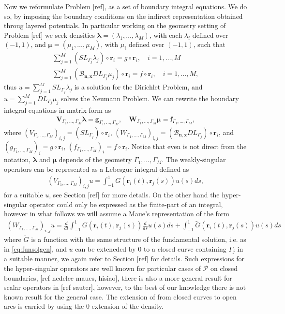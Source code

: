 \documentclass{article}
\newcommand{\todo}[1]{{\color{red}[#1]}}
\newcommand{\bmu} {\bm{\mu}}
\newcommand{\bg}{\bm{g}}
\newcommand{\bla}{\boldsymbol \lambda}
\newcommand{\bn}{\bm{n}}
\newcommand{\br}{\bm{r}}
\newcommand{\bx}{\bm{x}}
\begin{document}
Now we reformulate Problem \todo{ref}, as a set of boundary integral equations. We do so, by imposing the boundary conditions on the indirect representation obtained throug layered potentials. In particular working on the geometry setting of Problem \todo{ref} we seek densities $\bla = (\lambda_1,\hdots,\lambda_M)$, with each $\lambda_i$ defined over $(-1,1)$, and $\bmu = (\mu_1, \hdots, \mu_M)$, with $\mu_i$ defined over $(-1,1)$, such that
\begin{align*}
\sum_{j=1}^M (SL_{\Gamma_j} \lambda_j )\circ \br_i = g\circ \br_i, \quad i = 1,\hdots,M \\
\sum_{j=1}^M (\mathcal{B}_{\bn,\bx}DL_{\Gamma_j} \mu_j )\circ \br_i = f\circ \br_i, \quad i = 1,\hdots,M,
\end{align*}
 thus $u = \sum_{j=1}^M SL_{\Gamma_j} \lambda_j $ is a solution for the Dirichlet Problem, and  $u = \sum_{j=1}^M DL_{\Gamma_j} \mu_j $ solves the Neumann Problem. We can rewrite the boundary integral equations in matrix form as 
\begin{align}
\label{eq:bios}
\mathbf{V}_{\Gamma_1,\hdots,\Gamma_M} \bla = \bg_{\Gamma_1,\hdots,\Gamma_M}, \quad \mathbf{W}_{\Gamma_1,\hdots,\Gamma_M} \bmu = \mathbf{f}_{\Gamma_1,\hdots,\Gamma_M},
\end{align}
where $(V_{\Gamma_1,\hdots,\Gamma_M})_{i,j} = (SL_{\Gamma_j}  )\circ \br_i$, $(W_{\Gamma_1,\hdots,\Gamma_M})_{i,j} = (\mathcal{B}_{\bn,\bx}DL_{\Gamma_j} )\circ \br_i$, and $(g_{\Gamma_1,\hdots,\Gamma_M})_i = g \circ \br_i$, $(f_{\Gamma_1,\hdots,\Gamma_M})_i = f \circ \br_i$. Notice that even is not direct from the notation, $\bla$ and $\bmu$ depends of the geometry $\Gamma_1,\hdots,\Gamma_M$. The weakly-singular operators can be represented as a Lebesgue integral defined as 
\begin{align*}
(V_{\Gamma_1,\hdots,\Gamma_M})_{i,j}u = \int_{-1}^1G(\br_i(t),\br_j(s)) u(s) ds,
\end{align*}
for a suitable $u$, see Section \todo{ref} for more details. On the other hand the hyper-singular operator could only be expressed as the finite-part of an integral, however in what follows we will assume a Maue's representation of the form 
\begin{align}
\label{eq:mauesrep}
(W_{\Gamma_1,\hdots,\Gamma_M})_{i,j}u =  \frac{d}{dt}\int_{-1}^1G(\br_i(t),\br_j(s)) \frac{d}{ds}u(s) ds + 
\int_{-1}^1\widetilde{G}(\br_i(t),\br_j(s))u(s) ds
\end{align} 
where $\widetilde{G}$ is a function with the same structure of the fundamental solution, i.e. as in \eqref{eq:funsolgen}, and $u$ can be exteneded by 0 to a closed curve containing $\Gamma_j$ in a suitable manner, we again refer to Section \todo{ref} for details. Such expressions for the hyper-singular operators are well known for particular cases of $\mathcal{P}$ on closed boundaries, \todo{ref nedelec maues, hisiao}, there is also a more general result for scalar operators in \todo{ref sauter}, however, to the best of our knowledge there is not known result for the general case. The extension of from closed curves to open arcs is carried by using the $0$ extension of the density. 
\end{document}
